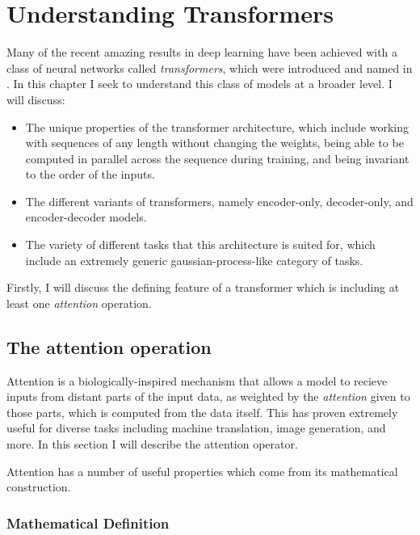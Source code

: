 \chapter{Understanding Transformers}
\label{C:transformers}

Many of the recent amazing results in deep learning have been achieved with a class of neural networks called \textit{transformers}, which were introduced and named in \cite{attention-is-all-you-need}. In this chapter I seek to understand this class of models at a broader level. I will discuss:

\begin{itemize}
    \item The unique properties of the transformer architecture, which include working with sequences of any length without changing the weights, being able to be computed in parallel across the sequence during training, and being invariant to the order of the inputs.
    \item The different variants of transformers, namely encoder-only, decoder-only, and encoder-decoder models.
    \item The variety of different tasks that this architecture is suited for, which include an extremely generic gaussian-process-like category of tasks.
\end{itemize}

Firstly, I will discuss the defining feature of a transformer which is including at least one \textit{attention} operation.

\section{The attention operation}

Attention is a biologically-inspired mechanism that allows a model to recieve inputs from distant parts of the input data, as weighted by the \textit{attention} given to those parts, which is computed from the data itself. This has proven extremely useful for diverse tasks including machine translation, image generation, and more. In this section I will describe the attention operator.

Attention has a number of useful properties which come from its mathematical construction.

\subsection{Mathematical Definition}

